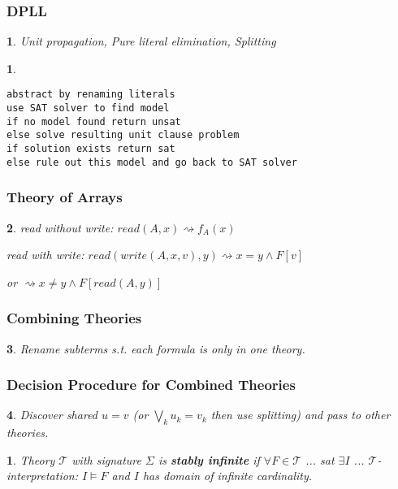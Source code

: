 \documentclass[]{article}
\newtheorem*{green}{}
\newtheorem*{red}{}
\newtheorem*{blue}{}
\begin{document}
\begin{multicols}{3}
\begin{minipage}[t]{.31\textwidth}
\subsubsection*{DPLL}
\begin{blue}
Unit propagation, Pure literal elimination, Splitting
\end{blue}

\begin{red}
\begin{verbatim}
abstract by renaming literals
use SAT solver to find model
if no model found return unsat
else solve resulting unit clause problem
if solution exists return sat
else rule out this model and go back to SAT solver
\end{verbatim}
\end{red}

\subsubsection*{Theory of Arrays}
\begin{blue}
read without write: $read(A,x) \rightsquigarrow f_A(x)$

read with write: $read(write(A,x,v),y) \rightsquigarrow x=y \land F[v]$

or \hspace{4cm} $\rightsquigarrow x\not= y \land F[read(A,y)]$
\end{blue}

\end{minipage}\hfil

\begin{minipage}[t]{.31\textwidth}

\subsubsection*{Combining Theories}
\begin{blue}
Rename subterms s.t. each formula is only in one theory.
\end{blue}

\subsubsection*{Decision Procedure for Combined Theories}
\begin{blue}
Discover shared $u=v$ (or $\bigvee_k u_k = v_k$ then use splitting) and pass to other theories.
\end{blue}

\begin{green}
Theory $\mathcal{T}$ with signature $\Sigma$ is \textbf{stably infinite} if $\forall F \in \mathcal{T}$ ... sat $\exists I$ ... $\mathcal{T}$-interpretation: $I \models F$ and $I$ has domain of infinite cardinality.


\end{green}
\end{minipage}
\end{multicols}
\end{document}
